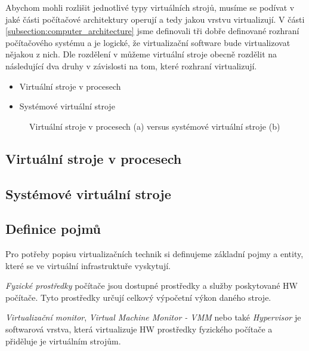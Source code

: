 Abychom mohli rozlišit jednotlivé typy virtuálních strojů, musíme se podívat v jaké části počítačové architektury operují a tedy jakou vrstvu virtualizují. V části \ref{subsection:computer_architecture} jsme definovali
tři dobře definované rozhraní počítačového systému a je logické, že virtualizační software bude virtualizovat nějakou z nich. Dle rozdělení v \cite{book:iee:vm_architecture} můžeme virtuální stroje obecně rozdělit na
následující dva druhy v závislosti na tom, které rozhraní virtualizují.

\begin{itemize}
 \item Virtuální stroje v procesech
 \item Systémové virtuální stroje
\end{itemize}



\begin{figure}
  \centering          
  \caption[Virtuální stroje v procesech (a) versus systémové virtuální stroje (b)]{Virtuální stroje v procesech (a) versus systémové virtuální stroje (b) \cite{book:iee:vm_architecture}}
  \label{figure:computer_architecture}
\end{figure}
  
  
  \subsection{Virtuální stroje v procesech}
  \subsection{Systémové virtuální stroje}
  
  
  \subsection{Definice pojmů}
  \label{definitions}

  Pro potřeby popisu virtualizačních technik si definujeme základní pojmy a entity, které se ve virtuální infrastruktuře vyskytují.

  \textit{Fyzické prostředky} počítače jsou dostupné prostředky a služby poskytované HW počítače. Tyto prostředky určují celkový výpočetní výkon daného stroje.

  \textit{Virtualizační monitor}, \textit{Virtual Machine Monitor - VMM} nebo také \textit{Hypervisor} je softwarová vrstva, která virtualizuje HW prostředky fyzického počítače a přiděluje je
  virtuálním strojům.

